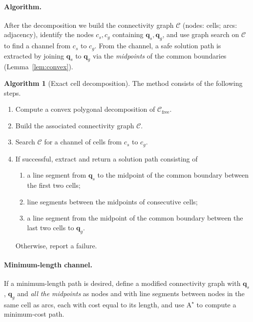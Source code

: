 \documentclass[11pt,a4paper]{article}
\newcommand{\Cfree}{\mathcal{C}_{\mathrm{free}}}
\newcommand{\qs}{\boldsymbol{q}_s}
\newcommand{\qg}{\boldsymbol{q}_g}
\theoremstyle{definition}
\newtheorem{algorithm}[definition]{Algorithm}
\theoremstyle{plain}
\theoremstyle{remark}
\begin{document}
\paragraph{Algorithm.} After the decomposition we build the connectivity graph $\mathcal{C}$ (nodes: cells; arcs: adjacency), identify the nodes $c_s,c_g$ containing $\qs,\qg$, and use graph search on $\mathcal{C}$ to find a channel from $c_s$ to $c_g$. From the channel, a safe solution path is extracted by joining $\qs$ to $\qg$ via the \emph{midpoints} of the common boundaries (Lemma~\ref{lem:convex}).

\begin{algorithm}[Exact cell decomposition]
\label{alg:exact}
The method consists of the following steps.
\begin{enumerate}
  \item Compute a convex polygonal decomposition of $\Cfree$.
  \item Build the associated connectivity graph $\mathcal{C}$.
  \item Search $\mathcal{C}$ for a channel of cells from $c_s$ to $c_g$.
  \item If successful, extract and return a solution path consisting of
  \begin{enumerate}[label=(\alph*)]
    \item a line segment from $\qs$ to the midpoint of the common boundary between the first two cells;
    \item line segments between the midpoints of consecutive cells;
    \item a line segment from the midpoint of the common boundary between the last two cells to $\qg$.
  \end{enumerate}
  Otherwise, report a failure.
\end{enumerate}
\end{algorithm}

\paragraph{Minimum-length channel.} If a minimum-length path is desired, define a modified connectivity graph with $\qs$, $\qg$ and \emph{all the midpoints} as nodes and with line segments between nodes in the same cell as arcs, each with cost equal to its length, and use $\mathrm{A}^\star$ to compute a minimum-cost path.
\end{document}
